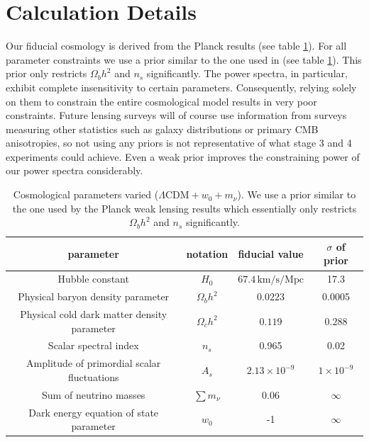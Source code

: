 \documentclass[11pt]{article} %
\begin{document}
\section{Calculation Details}\label{sec:calcdetails}
Our fiducial cosmology is derived from the Planck results \cite{planckresults} (see table \ref{tab:fiducialpars}). For all parameter constraints we use a prior similar to the one used in \cite{Planck2018Lensing} (see table \ref{tab:fiducialpars}). This prior only restricts $\Omega_b h^2$ and $n_s$ significantly. The power spectra, in particular, exhibit complete insensitivity to certain parameters. Consequently, relying solely on them to constrain the entire cosmological model results in very poor constraints. Future lensing surveys will of course use information from surveys measuring other statistics such as galaxy distributions or primary CMB anisotropies, so not using any priors is not representative of what stage 3 and 4 experiments could achieve. Even a weak prior improves the constraining power of our power spectra considerably.
\begin{table}[h!]
    \centering
    \begin{tabular}{|c|c|c|c|}
        \hline
        \textbf{parameter} & \textbf{notation} & \textbf{fiducial value} & \textbf{$\sigma$ of prior}\\
        \hline
        Hubble constant & $H_0$ & $67.4 \, \text{km/s/Mpc}$ & 17.3\\
        \hline
        Physical baryon density parameter & $\Omega_b h^2$ & $0.0223$ & 0.0005\\
        \hline
        Physical cold dark matter density parameter & $\Omega_c h^2$ & $0.119$ & $0.288$\\
        \hline
        Scalar spectral index & $n_s$ & 0.965 & 0.02 \\
        \hline
        Amplitude of primordial scalar fluctuations & $A_s$ & $2.13 \times 10^{-9}$ & $1\times 10^{-9}$ \\
        \hline
        Sum of neutrino masses & $\sum m_\nu$ & $0.06$ & $\infty$\\
        \hline
        Dark energy equation of state parameter & $w_0$ & -1 & $\infty$\\ \hline
    \end{tabular}
    \caption{Cosmological parameters varied ($\Lambda \text{CDM} + w_0 + m_\nu$). We use a prior similar to the one used by the Planck weak lensing results \cite{Planck2018Lensing} which essentially only restricts $\Omega_bh^2$ and $n_s$ significantly.}
    \label{tab:fiducialpars}
\end{table}
\end{document}
